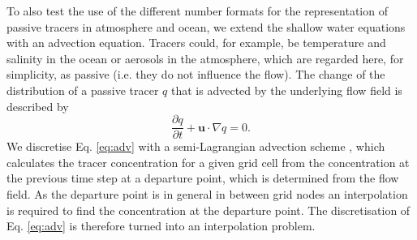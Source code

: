\documentclass[draft]{agujournal2019}
\begin{document}
To also test the use of the different number formats for the representation of passive tracers in atmosphere and ocean, we extend the shallow water equations with an advection equation. Tracers could, for example, be temperature and salinity in the ocean or aerosols in the atmosphere, which are regarded here, for simplicity, as passive (i.e. they do not influence the flow). The change of the distribution of a passive tracer $q$ that is advected by the underlying flow field is described by
\begin{equation}
\frac{\partial q}{\partial t} + \mathbf{u} \cdot \nabla q = 0.
\label{eq:adv}
\end{equation}
We discretise Eq. \ref{eq:adv} with a semi-Lagrangian advection scheme \cite{Smolarkiewicz1992}, which calculates the tracer concentration for a given grid cell from the concentration at the previous time step at a departure point, which is determined from the flow field. As the departure point is in general in between grid nodes an interpolation is required to find the concentration at the departure point. The discretisation of Eq. \ref{eq:adv} is therefore turned into an interpolation problem.
\end{document}
